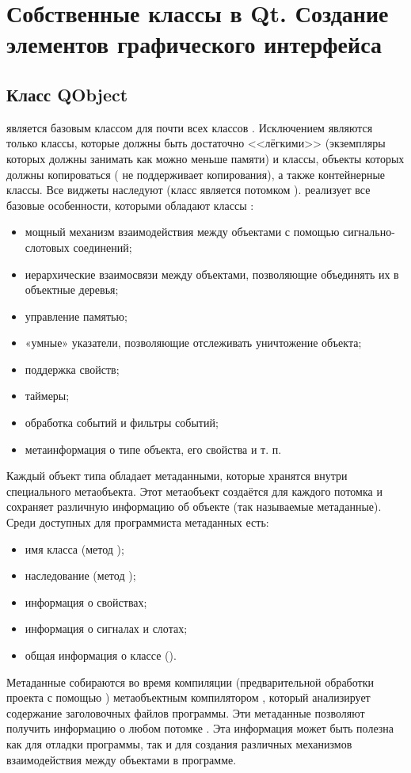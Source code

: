 \chapter[Создание элементов графического интерфейса]{Собственные классы в Qt.
Создание элементов графического интерфейса}
\section[Класс QObject]{Класс QObject}
 является базовым классом для почти всех классов . Исключением являются только
классы, которые должны быть достаточно <<лёгкими>> (экземпляры которых должны занимать как можно меньше
памяти) и классы, объекты которых должны копироваться ( не поддерживает копирования), а также
контейнерные классы. Все виджеты  наследуют  (класс  является потомком
).  реализует все базовые особенности, которыми обладают классы :

\begin{itemize}
\item мощный механизм взаимодействия между объектами с помощью сигнально-слотовых соединений;
\item иерархические взаимосвязи между объектами, позволяющие объединять их в объектные деревья;
\item управление памятью;
\item «умные» указатели, позволяющие отслеживать уничтожение объекта;
\item поддержка свойств;
\item таймеры;
\item обработка событий и фильтры событий;
\item метаинформация о типе объекта, его свойства и т. п.
\end{itemize}
Каждый объект типа  обладает метаданными, которые хранятся внутри специального
метаобъекта. Этот метаобъект создаётся для каждого потомка  и сохраняет
различную информацию об объекте (так называемые метаданные). Среди доступных для программиста метаданных есть:

\begin{itemize}
\item имя класса (метод );
\item наследование (метод );
\item информация о свойствах;
\item информация о сигналах и слотах;
\item общая информация о классе ().
\end{itemize}
Метаданные собираются во время компиляции (предварительной обработки проекта с помощью )
метаобъектным компилятором , который анализирует содержание заголовочных файлов программы. Эти метаданные
позволяют получить информацию о любом потомке . Эта информация может быть полезна как для отладки
программы, так и для создания различных механизмов взаимодействия между объектами в программе.

